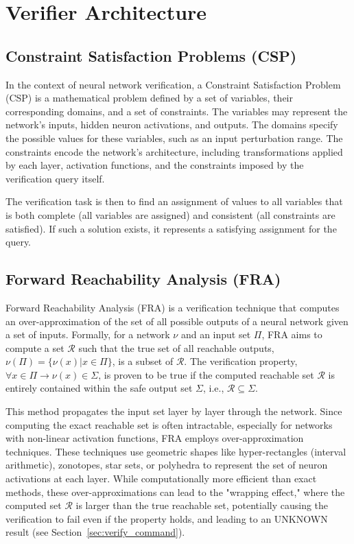 \section{Verifier Architecture}\label{sec:arch}

\subsection*{Constraint Satisfaction Problems (CSP)}\label{sec:csp}
In the context of neural network verification, a Constraint Satisfaction Problem (CSP) is a mathematical problem 
defined by a set of variables, their corresponding domains, and a set of constraints. The variables may represent
the network's inputs, hidden neuron activations, and outputs. The domains specify the possible values for these 
variables, such as an input perturbation range. The constraints encode the network's architecture, including 
transformations applied by each layer, activation functions, and the constraints imposed by the verification query itself.

The verification task is then to find an assignment of values to all variables that is both complete 
(all variables are assigned) and consistent (all constraints are satisfied). If such a solution exists, 
it represents a satisfying assignment for the query. 

\subsection*{Forward Reachability Analysis (FRA)}\label{sec:fra}
Forward Reachability Analysis (FRA) is a verification technique that computes an over-approximation 
of the set of all possible outputs of a neural network given a set of inputs. Formally, for a network $\nu$ 
and an input set $\Pi$, FRA aims to compute a set $\mathcal{R}$ such that the true set of all reachable outputs, 
$\nu(\Pi) = \{\nu(x) | x \in \Pi\}$, is a subset of $\mathcal{R}$. The verification property, 
$\forall x \in \Pi \rightarrow \nu(x) \in \Sigma$, is proven to be true if the computed reachable set $\mathcal{R}$ 
is entirely contained within the safe output set $\Sigma$, i.e., $\mathcal{R} \subseteq \Sigma$.

This method propagates the input set layer by layer through the network. Since computing the exact reachable set is often 
intractable, especially for networks with non-linear activation functions, FRA employs over-approximation techniques. 
These techniques use geometric shapes like hyper-rectangles (interval arithmetic), zonotopes, star sets, or polyhedra to represent 
the set of neuron activations at each layer. While computationally more efficient than exact methods, these over-approximations 
can lead to the "wrapping effect," where the computed set $\mathcal{R}$ is larger than the true reachable set, potentially causing 
the verification to fail even if the property holds, and leading to an UNKNOWN result (see Section~\ref{sec:verify_command}).

